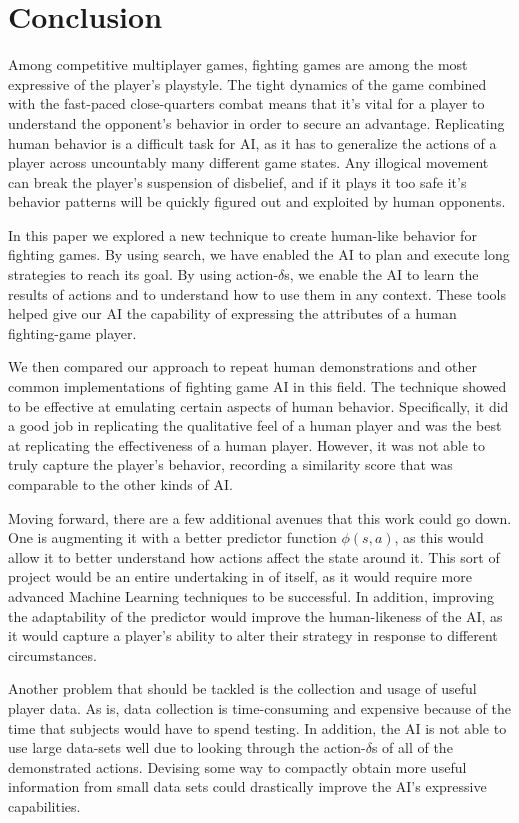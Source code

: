 
\chapter{Conclusion}

\label{Chapter6} %

Among competitive multiplayer games, fighting games are among the most expressive of the player's playstyle. The tight dynamics of the game combined with the fast-paced close-quarters combat means that it's vital for a player to understand the opponent’s behavior in order to secure an advantage. Replicating human behavior is a difficult task for AI, as it has to generalize the actions of a player across uncountably many different game states. Any illogical movement can break the player's suspension of disbelief, and if it plays it too safe it's behavior patterns will be quickly figured out and exploited by human opponents.

In this paper we explored a new technique to create human-like behavior for fighting games. By using search, we have enabled the AI to plan and execute long strategies to reach its goal. By using action-$\delta$s, we enable the AI to learn the results of actions and to understand how to use them in any context. These tools helped give our AI the capability of expressing the attributes of a human fighting-game player.

We then compared our approach to repeat human demonstrations and other common implementations of fighting game AI in this field. The technique showed to be effective at emulating certain aspects of human behavior. Specifically, it did a good job in replicating the qualitative feel of a human player and was the best at replicating the effectiveness of a human player. However, it was not able to truly capture the player's behavior, recording a similarity score that was comparable to the other kinds of AI.

Moving forward, there are a few additional avenues that this work could go down. One is augmenting it with a better predictor function $\phi(s,a)$, as this would allow it to better understand how actions affect the state around it. This sort of project would be an entire undertaking in of itself, as it would require more advanced Machine Learning techniques to be successful. In addition, improving the adaptability of the predictor would improve the human-likeness of the AI, as it would capture a player's ability to alter their strategy in response to different circumstances. 

Another problem that should be tackled is the collection and usage of useful player data. As is, data collection is time-consuming and expensive because of the time that subjects would have to spend testing. In addition, the AI is not able to use large data-sets well due to looking through the action-$\delta$s of all of the demonstrated actions. Devising some way to compactly obtain more useful information from small data sets could drastically improve the AI's expressive capabilities.
